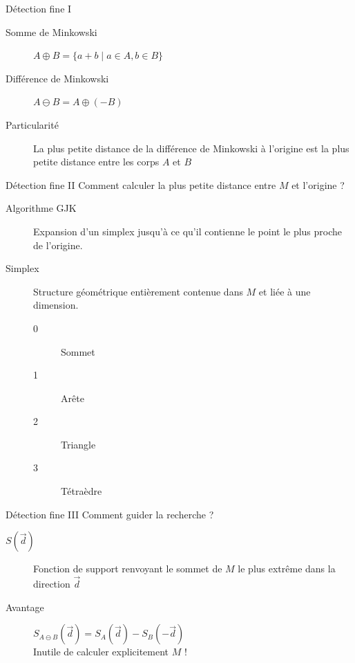 \documentclass{beamer}
\begin{document}
\begin{frame}{Détection fine I}
  \begin{description}
  \item[Somme de Minkowski]
    $A \oplus B = \{a + b \mid a \in A, b \in B\}$
  \item[Différence de Minkowski]
    $A \ominus B = A \oplus (-B)$
  \end{description}

  \begin{figure}
    \centering
    
    
  \end{figure}

  \begin{description}
  \item[Particularité]
    La plus petite distance de la différence de Minkowski à l'origine est la plus petite distance entre les corps $A$ et $B$
  \end{description}
\end{frame}

\begin{frame}{Détection fine II}
  Comment calculer la plus petite distance entre $M$ et l'origine ?

  \vfill

  \begin{description}
  \item[Algorithme GJK]
    Expansion d'un simplex jusqu'à ce qu'il contienne le point le plus proche de l'origine.
  \end{description}

  \vfill

  \begin{description}
  \item[Simplex] Structure géométrique entièrement contenue dans $M$ et liée à une dimension.
    \begin{description}
    \item[0] Sommet
    \item[1] Arête
    \item[2] Triangle
    \item[3] Tétraèdre
    \end{description}
  \end{description}
\end{frame}

\begin{frame}{Détection fine III}
  Comment guider la recherche ?

  \vfill

  \begin{description}
    \item[$S(\vec{d})$]
      Fonction de support renvoyant le sommet de $M$ le plus extrême dans la direction $\vec{d}$

      \vfill

    \item[Avantage]
      $S_{A \ominus B}(\vec{d}) = S_A(\vec{d}) - S_B(-\vec{d})$ \\
      Inutile de calculer explicitement $M$ !
  \end{description}
\end{frame}
\end{document}
